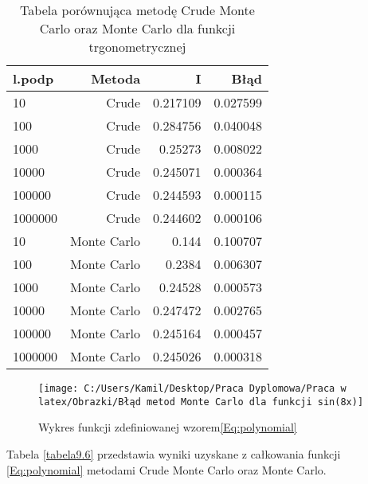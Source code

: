 \documentclass[12pt,twoside]{article}
\begin{document}
\begin{table}[h]
\centering 
\caption{Tabela porównująca metodę Crude Monte Carlo oraz Monte Carlo dla funkcji trgonometrycznej}
\label{tabela9.6}
\begin{tabular}{lrrr}
\toprule
{l.podp} & Metoda &  I &  Błąd \\
\midrule
10  &     Crude & 0.217109  &   0.027599 \\
100  &     Crude & 0.284756 &   0.040048 \\
1000  &    Crude & 0.25273   &   0.008022  \\
10000  &    Crude & 0.245071  &   0.000364  \\
100000  &    Crude & 0.244593 &    0.000115   \\
1000000  &    Crude & 0.244602 &    0.000106   \\
\midrule
10  &     Monte Carlo & 0.144  &   0.100707 \\
100  &     Monte Carlo & 0.2384  &   0.006307 \\
1000  &    Monte Carlo & 0.24528   &   0.000573  \\
10000  &    Monte Carlo & 0.247472  &   0.002765  \\
100000  &    Monte Carlo & 0.245164 &    0.000457   \\
1000000  &    Monte Carlo & 0.245026 &    0.000318   \\
\bottomrule
\end{tabular}
\end{table}

\begin{figure}
\texttt{[image: C:/Users/Kamil/Desktop/Praca Dyplomowa/Praca w latex/Obrazki/Błąd metod Monte Carlo dla funkcji sin(8x)]}
\caption{Wykres funkcji zdefiniowanej wzorem\eqref{Eq:polynomial}}
\end{figure}


Tabela \eqref{tabela9.6} przedstawia wyniki uzyskane z całkowania funkcji \eqref{Eq:polynomial} metodami Crude Monte Carlo oraz Monte Carlo.
\end{document}
